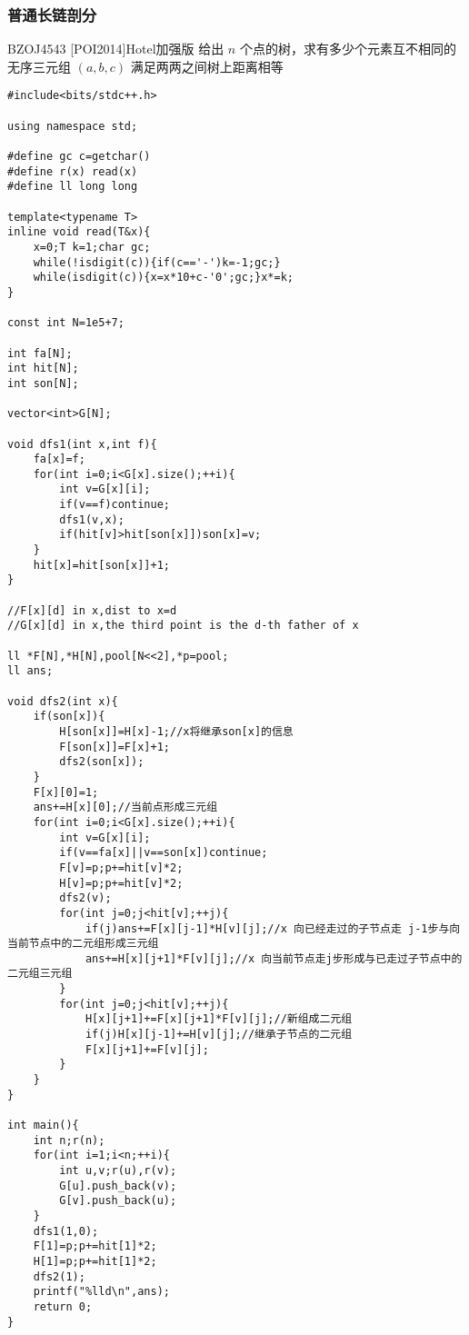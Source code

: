 \documentclass{ctexart}
\begin{document}
\subsubsection{普通长链剖分}
BZOJ4543 [POI2014]Hotel加强版
给出 $n$ 个点的树，求有多少个元素互不相同的无序三元组 $(a,b,c)$ 满足两两之间树上距离相等
\begin{lstlisting}
#include<bits/stdc++.h>

using namespace std;

#define gc c=getchar()
#define r(x) read(x)
#define ll long long

template<typename T>
inline void read(T&x){
    x=0;T k=1;char gc;
    while(!isdigit(c)){if(c=='-')k=-1;gc;}
    while(isdigit(c)){x=x*10+c-'0';gc;}x*=k;
}

const int N=1e5+7;

int fa[N];
int hit[N];
int son[N];

vector<int>G[N];

void dfs1(int x,int f){
	fa[x]=f;
	for(int i=0;i<G[x].size();++i){
		int v=G[x][i];
		if(v==f)continue;
		dfs1(v,x);
		if(hit[v]>hit[son[x]])son[x]=v;
	}
	hit[x]=hit[son[x]]+1;
}

//F[x][d] in x,dist to x=d
//G[x][d] in x,the third point is the d-th father of x

ll *F[N],*H[N],pool[N<<2],*p=pool;
ll ans;

void dfs2(int x){
	if(son[x]){
		H[son[x]]=H[x]-1;//x将继承son[x]的信息 
		F[son[x]]=F[x]+1;
		dfs2(son[x]);
	}
	F[x][0]=1;
	ans+=H[x][0];//当前点形成三元组 
	for(int i=0;i<G[x].size();++i){
		int v=G[x][i];
		if(v==fa[x]||v==son[x])continue;
		F[v]=p;p+=hit[v]*2;
		H[v]=p;p+=hit[v]*2;
		dfs2(v);
		for(int j=0;j<hit[v];++j){
			if(j)ans+=F[x][j-1]*H[v][j];//x 向已经走过的子节点走 j-1步与向当前节点中的二元组形成三元组 
			ans+=H[x][j+1]*F[v][j];//x 向当前节点走j步形成与已走过子节点中的二元组三元组 
		}
		for(int j=0;j<hit[v];++j){
			H[x][j+1]+=F[x][j+1]*F[v][j];//新组成二元组 
			if(j)H[x][j-1]+=H[v][j];//继承子节点的二元组 
			F[x][j+1]+=F[v][j]; 
		}
	}
}

int main(){
	int n;r(n);
	for(int i=1;i<n;++i){
		int u,v;r(u),r(v);
		G[u].push_back(v);
		G[v].push_back(u);
	}
	dfs1(1,0);
	F[1]=p;p+=hit[1]*2;
	H[1]=p;p+=hit[1]*2;
	dfs2(1);
	printf("%lld\n",ans);
	return 0;
}
\end{lstlisting}
\end{document}
